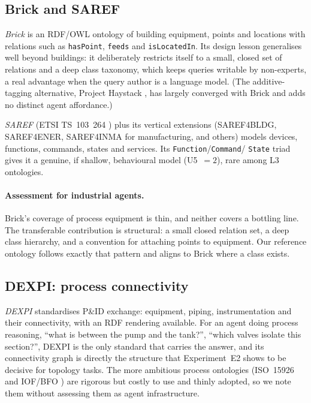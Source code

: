 \subsection{Brick and SAREF}

\emph{Brick} \cite{balaji2016brick} is an RDF/OWL ontology of building
equipment, points and locations with relations such as \texttt{hasPoint},
\texttt{feeds} and \texttt{isLocatedIn}. Its design lesson generalises well beyond
buildings: it deliberately restricts itself to a small, closed set of relations
and a deep class taxonomy, which keeps queries writable by non-experts, a real
advantage when the query author is a language model. (The additive-tagging
alternative, Project Haystack \cite{haystack}, has largely converged with Brick
and adds no distinct agent affordance.)

\emph{SAREF} (ETSI TS~103~264 \cite{etsi2020saref}) plus its vertical extensions
(SAREF4BLDG, SAREF4ENER, SAREF4INMA for manufacturing, and others) models
devices, functions, commands, states and services. Its \texttt{Function}/\texttt{Command}/
\texttt{State} triad gives it a genuine, if shallow, behavioural model
(U5~$=2$), rare among L3 ontologies.

\paragraph{Assessment for industrial agents.} Brick's coverage of process
equipment is thin, and neither covers a bottling line. The transferable
contribution is structural: a small closed relation set, a deep class hierarchy,
and a convention for attaching points to equipment. Our reference ontology follows
exactly that pattern and aligns to Brick where a class exists.

\subsection{DEXPI: process connectivity}

\emph{DEXPI} \cite{dexpi} standardises P\&ID exchange: equipment, piping,
instrumentation and their connectivity, with an RDF rendering available. For an
agent doing process reasoning, ``what is between the pump and the tank?'', ``which
valves isolate this section?'', DEXPI is the only standard that carries the answer,
and its connectivity graph is directly the structure that Experiment~E2 shows to
be decisive for topology tasks. The more ambitious process ontologies
(ISO~15926 \cite{iso15926} and IOF/BFO \cite{iof}) are rigorous but costly to use
and thinly adopted, so we note them without assessing them as agent infrastructure.


